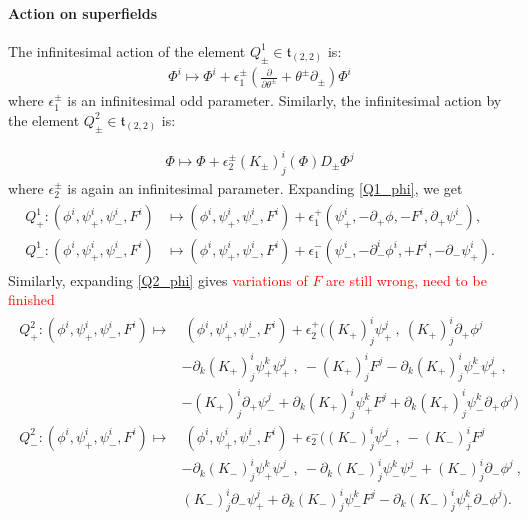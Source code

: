 \documentclass{article}
\newcommand{\p}{\partial}
\theoremstyle{definition}
\theoremstyle{remark}
\begin{document}
\paragraph{Action on superfields} The infinitesimal action of the element $Q^1_{\pm} \in \mathfrak{t}_{(2,2)}$ is:
\begin{align}\label{Q1_phi}
\Phi^i \mapsto \Phi^i + \epsilon^{\pm}_1 \left( \frac{\p}{\p\theta^\pm}+\theta^\pm\p_\pm \right) \Phi^i
\end{align}
where $\epsilon^{\pm}_1$ is an infinitesimal odd parameter. Similarly, the infinitesimal action by the element $Q^2_{\pm} \in \mathfrak{t}_{(2,2)}$ is:

\begin{align}\label{Q2_phi}
 \Phi \mapsto \Phi + \epsilon^{\pm}_2 (K_\pm)^i_j(\Phi)D_\pm\Phi^j
\end{align}
where $\epsilon^\pm_2$ is again an infinitesimal parameter. Expanding \eqref{Q1_phi}, we get
\begin{align}\label{Q1_action}
\begin{aligned}
Q^1_{+} : (\phi^i, \psi^i_+, \psi^i_-, F^i) &\mapsto (\phi^i, \psi^i_+,\psi^i_-, F^i) + \epsilon^+_1 (\psi^i_+, -\partial_+ \phi, -F^i, \partial_+ \psi^i_-),\\
Q^1_{-} : (\phi^i, \psi^i_+, \psi^i_-, F^i)  &\mapsto (\phi^i, \psi^i_+,\psi^i_-, F^i) + \epsilon^-_1 (\psi^i_-, -\partial^i_- \phi^i, + F^i, - \partial_- \psi^i_+). 
\end{aligned}
\end{align}
Similarly, expanding \eqref{Q2_phi} gives \textcolor{red}{variations of $F$ are still wrong, need to be finished}
\begin{align}\label{Q2_action}
\begin{aligned}
Q^2_{+} : (\phi^i, \psi^i_+, \psi^i_-, F^i) \mapsto &\  (\phi^i, \psi^i_+, \psi^i_-, F^i)
+\epsilon_2^+\Big((K_+)^i_j \psi_+ ^j\ ,\  (K_+)^{i}_{j} \partial_+ \phi^j\\
& -\partial_k(K_+)^i_j \psi_+^k \psi_+^j\ ,\ -(K_+)^i_j F^j{-}\p_k(K_+)^i_j\psi^k_-\psi^j_+\ ,\ \\
&-(K_+)^i_j\p_+\psi_-^j+\p_k(K_+)^i_j\psi^k_+F^j+\p_k(K_+)^i_j\psi^k_-\p_+\phi^j\Big)\\
Q^2_{-} : (\phi^i, \psi^i_+, \psi^i_-, F^i) \mapsto &\ (\phi^i, \psi^i_+, \psi^i_-, F^i)
+\epsilon_2^-\Big((K_-)^i_j \psi_- ^j\ ,\ - (K_-)^i_j F^j  \\
&-\partial_k(K_-)^i_j \psi_+^k \psi_-^j\ ,\ -\p_k(K_-)^i_j\psi^k_-\psi^j_-+(K_-)^{i}_{j} \partial_- \phi^j\ ,\  \\
&(K_-)^i_j\p_-\psi_+^j+\p_k(K_-)^i_j\psi^k_-F^j-\p_k(K_-)^i_j\psi^k_+\p_-\phi^j\Big).
\end{aligned}
\end{align}
\end{document}
